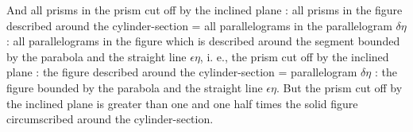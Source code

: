 \documentclass[12pt]{article}
\begin{document}
And all prisms in the prism cut off by the inclined plane : all prisms
in the figure described around the cylinder-section = all
parallelograms in the parallelogram $\delta\eta$ : all parallelograms
in the figure which is described around the segment bounded by the
parabola and the straight line $\epsilon\eta$, i. e., the prism cut
off by the inclined plane : the figure described around the
cylinder-section = parallelogram $\delta\eta$ : the figure bounded by
the parabola and the straight line $\epsilon\eta$. But the prism cut
off by the inclined plane is greater than one and one half times the
solid figure circumscribed around the
cylinder-section\dotfill\linebreak.\dotfill\linebreak

\vfill
\end{document}
